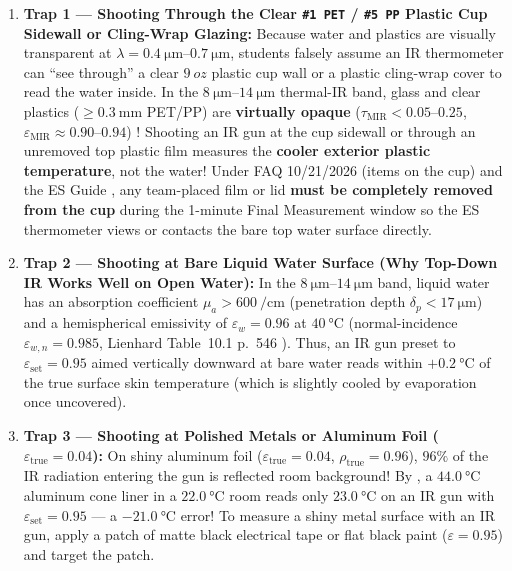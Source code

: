 \begin{trapbox}
\begin{enumerate}
  \item \textbf{Trap 1 --- Shooting Through the Clear \texttt{\#1 PET} / \texttt{\#5 PP} Plastic Cup Sidewall or Cling-Wrap Glazing:} 
  Because water and plastics are visually transparent at $\lambda = \SIrange{0.4}{0.7}{\micro\meter}$, students falsely assume an IR thermometer can ``see through'' a clear $\SI{9}{oz}$ plastic cup wall or a plastic cling-wrap cover to read the water inside. In the $\SIrange{8}{14}{\micro\meter}$ thermal-IR band, glass and clear plastics ($\ge\SI{0.3}{\milli\meter}$ PET/PP) are \textbf{virtually opaque} ($\tau_{\mathrm{MIR}} < 0.05\text{--}0.25$, $\varepsilon_{\mathrm{MIR}} \approx 0.90\text{--}0.94$) ! Shooting an IR gun at the cup sidewall or through an unremoved top plastic film measures the \textbf{cooler exterior plastic temperature}, not the water! Under FAQ 10/21/2026 (items on the cup) and the ES Guide , any team-placed film or lid \textbf{must be completely removed from the cup} during the 1-minute Final Measurement window so the ES thermometer views or contacts the bare top water surface directly.
  \item \textbf{Trap 2 --- Shooting at Bare Liquid Water Surface (Why Top-Down IR Works Well on Open Water):}
  In the $\SIrange{8}{14}{\micro\meter}$ band, liquid water has an absorption coefficient $\mu_a > \SI{600}{\per\centi\meter}$ (penetration depth $\delta_p < \SI{17}{\micro\meter}$) and a hemispherical emissivity of $\varepsilon_w = \mathbf{0.96}$ at $\SI{40}{\celsius}$ (normal-incidence $\varepsilon_{w,n} = 0.985$, Lienhard Table~10.1 p.~546 ). Thus, an IR gun preset to $\varepsilon_{\mathrm{set}} = 0.95$ aimed vertically downward at bare water reads within $+\SI{0.2}{\celsius}$ of the true surface skin temperature (which is slightly cooled by evaporation once uncovered).
  \item \textbf{Trap 3 --- Shooting at Polished Metals or Aluminum Foil ($\varepsilon_{\mathrm{true}} = 0.04$):}
  On shiny aluminum foil ($\varepsilon_{\mathrm{true}} = 0.04$, $\rho_{\mathrm{true}} = 0.96$), $96\%$ of the IR radiation entering the gun is reflected room background! By , a $\SI{44.0}{\celsius}$ aluminum cone liner in a $\SI{22.0}{\celsius}$ room reads only $\SI{23.0}{\celsius}$ on an IR gun with $\varepsilon_{\mathrm{set}} = 0.95$ --- a $-\SI{21.0}{\celsius}$ error! To measure a shiny metal surface with an IR gun, apply a patch of matte black electrical tape or flat black paint ($\varepsilon = 0.95$) and target the patch.

\end{enumerate}
\end{trapbox}
